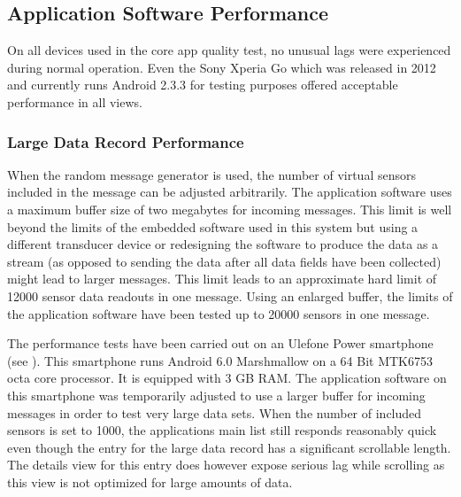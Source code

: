 \subsection{Application Software Performance}
On all devices used in the core app quality test, no unusual lags were experienced during normal operation. Even the Sony Xperia Go which was released in 2012 and currently runs Android 2.3.3 for testing purposes offered acceptable performance in all views.

\subsubsection{Large Data Record Performance}
When the random message generator is used, the number of virtual sensors included in the message can be adjusted arbitrarily. The application software uses a maximum buffer size of two megabytes for incoming messages. This limit is well beyond the limits of the embedded software used in this system but using a different transducer device or redesigning the software to produce the data as a stream (as opposed to sending the data after all data fields have been collected) might lead to larger messages. This limit leads to an approximate hard limit of 12000 sensor data readouts in one message. Using an enlarged buffer, the limits of the application software have been tested up to 20000 sensors in one message.

The performance tests have been carried out on an Ulefone Power smartphone (see \cite{UlePow}). This smartphone runs Android 6.0 Marshmallow on a 64 Bit MTK6753 octa core processor. It is equipped with 3 GB RAM. The application software on this smartphone was temporarily adjusted to use a larger buffer for incoming messages in order to test very large data sets. When the number of included sensors is set to 1000, the applications main list still responds reasonably quick even though the entry for the large data record has a significant scrollable length. The details view for this entry does however expose serious lag while scrolling as this view is not optimized for large amounts of data.

